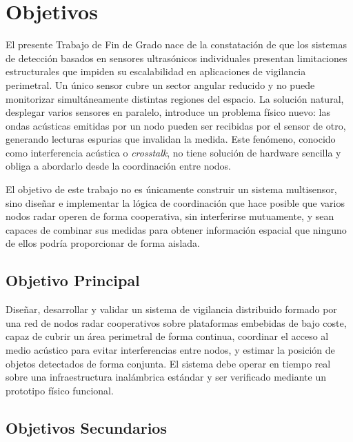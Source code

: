 \chapter{Objetivos}

El presente Trabajo de Fin de Grado nace de la constatación de que los sistemas de detección basados en sensores ultrasónicos individuales presentan limitaciones estructurales que impiden su escalabilidad en aplicaciones de vigilancia perimetral. Un único sensor cubre un sector angular reducido y no puede monitorizar simultáneamente distintas regiones del espacio. La solución natural, desplegar varios sensores en paralelo, introduce un problema físico nuevo: las ondas acústicas emitidas por un nodo pueden ser recibidas por el sensor de otro, generando lecturas espurias que invalidan la medida. Este fenómeno, conocido como interferencia acústica o \textit{crosstalk}, no tiene solución de hardware sencilla y obliga a abordarlo desde la coordinación entre nodos.

El objetivo de este trabajo no es únicamente construir un sistema multisensor, sino diseñar e implementar la lógica de coordinación que hace posible que varios nodos radar operen de forma cooperativa, sin interferirse mutuamente, y sean capaces de combinar sus medidas para obtener información espacial que ninguno de ellos podría proporcionar de forma aislada.

\section{Objetivo Principal}

Diseñar, desarrollar y validar un sistema de vigilancia distribuido formado por una red de nodos radar cooperativos sobre plataformas embebidas de bajo coste, capaz de cubrir un área perimetral de forma continua, coordinar el acceso al medio acústico para evitar interferencias entre nodos, y estimar la posición de objetos detectados de forma conjunta. El sistema debe operar en tiempo real sobre una infraestructura inalámbrica estándar y ser verificado mediante un prototipo físico funcional.

\section{Objetivos Secundarios}

